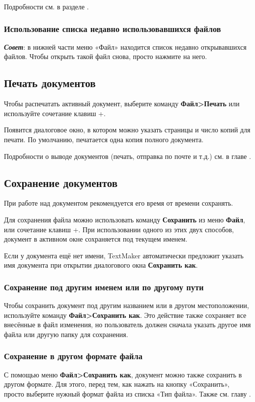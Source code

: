 ﻿\documentclass[a4paper,10pt]{article}
\begin{document}
Подробности см. в разделе .

\subsubsection{Использование списка недавно использовавшихся файлов}
\textit{\textbf{Совет}}: в нижней части меню «Файл» находится список недавно открывавшихся файлов. Чтобы открыть такой файл снова, просто нажмите на него.

\subsection{Печать документов}
Чтобы распечатать активный документ, выберите команду \textbf{Файл>Печать} или используйте сочетание клавиш +.

Появится диалоговое окно, в котором можно указать страницы и число копий для печати. По умолчанию, печатается одна копия полного документа.

Подробности о выводе документов (печать, отправка по почте и т.д.) см. в главе .

\subsection{Сохранение документов} \label{sec:сохранениедок}
При работе над документом рекомендуется его время от времени сохранять.

Для сохранения файла можно использовать команду \textbf{Сохранить} из меню \textbf{Файл}, или сочетание клавиш +. При использовании одного из этих двух способов, документ в активном окне сохраняется под  текущем именем.

Если у документа ещё нет имени, TextMaker автоматически предложит указать имя документа при открытии диалогового окна \textbf{Сохранить как}.

\subsubsection{Сохранение под другим именем или по другому пути}
Чтобы сохранить документ под другим названием или в другом местоположении, используйте команду \textbf{Файл>Сохранить как}. Это действие также сохраняет все внесённые в файл изменения, но пользователь должен сначала указать другое имя файла или другую папку для сохранения.

\subsubsection{Сохранение в другом формате файла}
С помощью меню \textbf{Файл>Сохранить как}, документ можно также сохранить в другом формате. Для этого, перед тем, как нажать на кнопку «Сохранить», просто выберите нужный формат файла из списка «Тип файла». Также см. главу .
\end{document}
